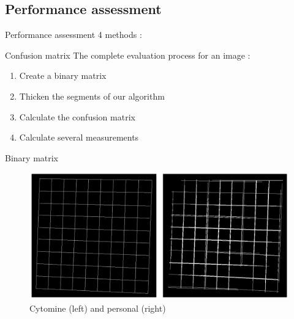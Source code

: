 \documentclass[12pt, dvipsnames]{beamer}
\begin{document}
\subsection{Performance assessment}

\begin{frame}{Performance assessment}
    4 methods :
    \begin{itemize}
    \end{itemize}
\end{frame}

\begin{frame}{Confusion matrix}
    The complete evaluation process for an image :
    \begin{enumerate}
        \item Create a binary matrix
        \item Thicken the segments of our algorithm
        \item Calculate the confusion matrix
        \item Calculate several measurements
    \end{enumerate}
\end{frame}

\begin{frame}{Binary matrix}
    \begin{figure}
        \centering
        \includegraphics[width=\textwidth]{resources/png/binary-matrices.png}
        \caption{Cytomine (left) and personal (right)}
    \end{figure}
\end{frame}
\end{document}
